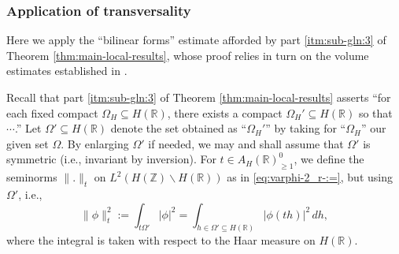 \documentclass[reqno]{amsart}
\theoremstyle{plain} \newtheorem{theorem} {Theorem}
\theoremstyle{definition} \newtheorem{definition} [theorem] {Definition}
\theoremstyle{itplain} %
\numberwithin{equation}{section}
\numberwithin{theorem}{section}
\renewcommand{\geq}{\geqslant}
\begin{document}
\subsubsection{Application of transversality}
Here we apply the ``bilinear forms'' estimate afforded by part \eqref{itm:sub-gln:3} of Theorem \ref{thm:main-local-results}, whose proof relies in turn on the volume estimates established in \cite[\S15--16]{2020arXiv201202187N}.

Recall that part \eqref{itm:sub-gln:3} of Theorem \ref{thm:main-local-results} asserts ``for each fixed compact $\Omega_{H} \subseteq H(\mathbb{R})$, there exists a compact $\Omega_{H}' \subseteq H(\mathbb{R})$ so that $\dotsb$.''  Let $\Omega ' \subseteq H(\mathbb{R})$ denote the set obtained as ``$\Omega_{H}'$'' by taking for ``$\Omega_H$'' our given set $\Omega$.  By enlarging $\Omega '$ if needed, we may and shall assume that $\Omega '$ is symmetric (i.e., invariant by inversion).  For $t \in A_H(\mathbb{R})^0_{\geq 1}$, we define the seminorms $\|.\|_t$ on $L^2(H(\mathbb{Z}) \backslash H(\mathbb{R}))$ as in \eqref{eq:varphi-2_r-:=}, but using $\Omega '$, i.e.,
\begin{equation*}
  \|\phi\|^2_t := \int _{t \Omega' } |\phi|^2
  =
  \int _{h \in \Omega' \subseteq H(\mathbb{R})}
  |\phi(t h)|^2
  \, d h,
\end{equation*}
where the integral is taken with respect to the Haar measure on $H(\mathbb{R})$.
\end{document}
